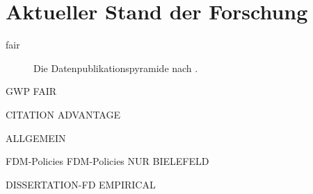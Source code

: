 \chapter{Aktueller Stand der Forschung}\label{ch:forschungsstand}
\gls{fair}

\begin{figure}[!htbp]
    \resizebox{\textwidth}{!}{}
    \caption{Die Datenpublikationspyramide nach \citeauthor{ReillyEtAl2011} \autocite{ReillyEtAl2011}.}
    \label{fig:data-pyramid}
\end{figure}

GWP \autocite{dfg-gwp}
FAIR \autocite{Wilkinson2016}

CITATION ADVANTAGE \autocite{Bautista-Puig2020}

ALLGEMEIN \autocite{Hopf2022}


FDM-Policies \autocite{Briney2015-Policy,Hiemenz2018-fdm-report,Hiemenz2018-fdm-title}
FDM-Policies NUR BIELEFELD \autocite{hrk-fdm}

\autocite{dfg-positionspapier,hrk-fdm}


DISSERTATION-FD EMPIRICAL \autocite{Campbell2019}

\autocite{Martin2013Wissenschaftliche,ReillyEtAl2011,Tenopir2011,TenopirEtAl2017,Tröger2016,Wünsche2018Forschungsdaten,Piwowar2013-DataReuse}

\autocite{Weisbrod2017eDissPlus,Weisbrod2018,dnb2017}

\autocite{Schöpfel2015}